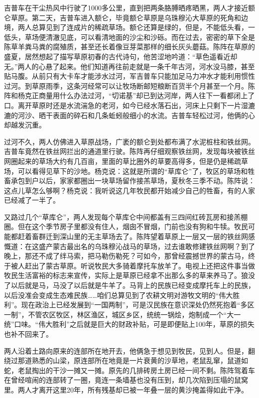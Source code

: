 \par 吉普车在干尘热风中行驶了1000多公里，直到把两条胳膊晒疼晒黑，两人才接近额仑草原。第二天，吉普车进入额仑，毕竟额仑草原是乌珠穆沁大草原的死角和边境，两人总算见到了连成片的稀疏草场。额仑还算是绿的，但是，不能低头看，一低头，草场便清澈见底，可以看清地面的沙尘和沙砾。而在过去，密密的草下全是陈草羊粪马粪的腐殖质，甚至还长着像豆芽菜那样的细长灰头蘑菇。陈阵在草原的盛夏，居然想起了描写草原初春的古代诗句，他苦涩地吟道：“草色遥看近却无。”两人的心悬了起来。他们知道再往前走就是一条千年古河，河水没马膝，甚至贴马腹。从前只有大卡车才能涉水过河，军吉普车只能加足马力冲水才能利用惯性过河。到草原雨季，这条河经常可以让牧场断邮短粮断百货半个月甚至一个月。陈阵和杨克正商量用什么办法过河，“切诺基”却已到达河岸，两人往下一看都闭上了口。离开草原时还是水流湍急的老河，如今已经水落石出，河床上只剩下一片湿漉漉的河沙、晒干表面的碎石和几条蚯蚓般细小的水流。吉普车轻松过河，他俩的心却越发沉重。
\par 过河不久，两人仿佛进入草原战场，广袤的额仑到处都布满了水泥桩柱和铁丝网。吉普车竟然在铁丝网拦出的通道里行驶。陈阵再仔细观察铁丝网，发现每块被铁丝网圈起来的草场大约有几百亩，里面的草比圈外的草要高得多，但是仍是稀疏草场，可以看得见草下的沙地。杨克说：这就是所谓的“草库仑”了，牧区的草场和牲畜承包到户以后，家家都圈出一块草场留作接羔草场，夏秋冬三季不动。陈阵说：这点儿草怎么够啊？杨克说：我听说这几年牧民都开始减少自己的牲畜，有的人家已经减了一半了。
\par 又路过几个“草库仑”，两人发现每个草库仑中间都盖有三四间红砖瓦房和接羔棚圈。但在这个季节房子里都没有住人，烟囱不冒烟，门前也没有狗和牛犊。牧民可能都赶着畜群迁到深山里的无主草场去了。陈阵望着草原上一层又一层的铁丝网感慨道：在这盛产蒙古最出名的乌珠穆沁战马的草场，过去谁敢修建铁丝网啊？到了晚上，那还不成了绊马索，把马勒伤勒死？可如今，那曾经震撼世界的蒙古马，终于被人赶出了蒙古草原。听说牧民大多骑着摩托车放羊了。电视上还把这件事当做牧民生活富裕的标志来宣传，实际上是草原已经拿不出那么多的草来养马了。狼没了以后就是马，马没了以后就是牛羊了。马背上的民族已经变成摩托车上的民族，以后没准会变成生态难民族……咱们总算见到了农耕文明对游牧文明的“伟大胜利”。现在政治上已经发展到“一国两制”，可是汉民族在意识深处仍然死抱着“多区一制”，不管农区牧区，林区渔区，城区乡区，统统一锅烩，炮制成一个“大一统”口味。“伟大胜利”之后就是巨大的财政补贴，可是即便贴上100年，草原的损失也补不回来了。
\par 两人沿着土路向原来的连部所在地开去，他俩急于想见到牧民，见到人。但是，翻绕过那道熟悉的山梁，原连部所在地竟是一片衰黄的沙草地，老鼠乱窜，鼠道如蛇，老鼠掏出的干沙一摊又一摊。原先的几排砖房土房已经一间不剩。陈阵驾着车在曾经喧闹的连部转了一圈，竟连一条墙基也没有压到，却几次陷到压塌的鼠窝里。两人才离开这里20年，所有残基却已被一年叠一层的黄沙掩盖得如此干净。
